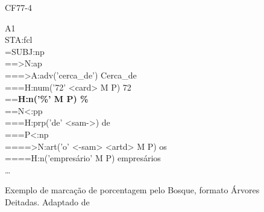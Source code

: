 \begin{figure}[!h]
    CF77-4 \\
    \centering
    \begin{minipage}{10cm}
        A1\\
        STA:fcl\\
        =SUBJ:np\\
        ==>N:ap\\
        ===>A:adv('cerca\_de')  Cerca\_de\\
        ===H:num('72' <card> M P)  72\\
        ==\textbf{H:n('\%' M P)  \%}\\
        ==N<:pp\\
        ===H:prp('de' <sam->)  de\\
        ===P<:np\\
        ====>N:art('o' <-sam> <artd> M P)  os\\
        ====H:n('empresário' M P)  empresários\\    
        \ldots
    \end{minipage}
    \caption[Exemplo de marcação de porcentagem pelo Bosque]{Exemplo de marcação de porcentagem pelo Bosque, formato Árvores Deitadas. Adaptado de }
    \label{fig:bosque_percent}
\end{figure}
